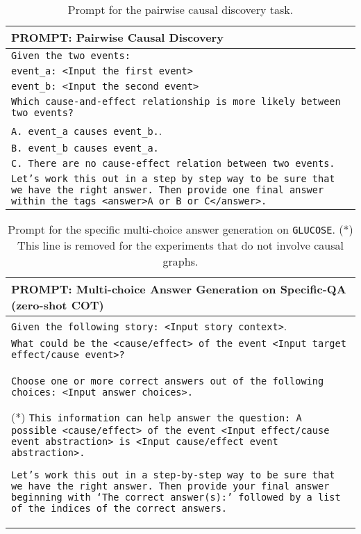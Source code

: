 \begin{table*}[!h]
    \centering
    \begin{tabular}{p{14cm}}
\toprule
\textbf{PROMPT: Pairwise Causal Discovery}\\
\midrule

\texttt{Given the two events:} \\ 

\texttt{event\_a: <Input the first event>}\\

\texttt{event\_b: <Input the second event>}\\

\texttt{Which cause-and-effect relationship is more likely between two events?} \\ 

\texttt{A. event\_a causes event\_b.}.  \\ 

\texttt{B. event\_b causes event\_a.} \\

\texttt{C. There are no cause-effect relation between two events.} \\

\texttt{Let’s work this out in a step by step way to be sure that we have the right answer. Then provide one final answer within the tags <answer>A or B or C</answer>.} \\

\bottomrule
\end{tabular}
\caption{Prompt for the pairwise causal discovery task.}
\label{tab:prompt_causal_discovery}
\end{table*}

\begin{table*}[!h]
    \centering
    \begin{tabular}{p{14cm}}
\toprule

\textbf{PROMPT: Multi-choice Answer Generation on Specific-QA (zero-shot COT)}\\
\midrule

\texttt{Given the following story: <Input story context>}.  \\ 

\texttt{What could be the <cause/effect> of the event <Input target effect/cause event>?} \\

\texttt{Choose one or more correct answers out of the following choices: <Input answer choices>.}

(*) \texttt{This information can help answer the question: A possible <cause/effect> of the event <Input effect/cause event abstraction> is <Input cause/effect event abstraction>.} 

\texttt{Let’s work this out in a step-by-step way to be sure that we have the right answer. Then provide your final answer beginning with `The correct answer(s):' followed by a list of the indices of the correct answers.} \\
\bottomrule
\end{tabular}
\caption{Prompt for the specific multi-choice answer generation on \texttt{GLUCOSE}. (*) This line is removed for the experiments that do not involve causal graphs.}
\label{tab:prompt_specific_qa}
\end{table*}


